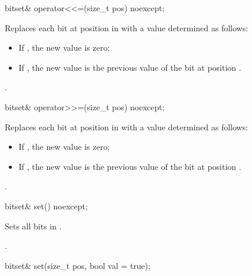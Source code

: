 %
\begin{itemdecl}
bitset& operator<<=(size_t pos) noexcept;
\end{itemdecl}

\begin{itemdescr}
\pnum
\effects
Replaces each bit at position  in
with a value determined as follows:

\begin{itemize}
\item
If , the new value is zero;
\item
If , the new value is the previous
value of the bit at position .
\end{itemize}

\pnum
\returns
{}.
\end{itemdescr}

%
\begin{itemdecl}
bitset& operator>>=(size_t pos) noexcept;
\end{itemdecl}

\begin{itemdescr}
\pnum
\effects
Replaces each bit at position  in
with a value determined as follows:

\begin{itemize}
\item
If , the new value is zero;
\item
If , the new value is the previous value of the bit at position .
\end{itemize}

\pnum
\returns
{}.
\end{itemdescr}

%
%
\begin{itemdecl}
bitset& set() noexcept;
\end{itemdecl}

\begin{itemdescr}
\pnum
\effects
Sets all bits in
.

\pnum
\returns
{}.
\end{itemdescr}

%
%
\begin{itemdecl}
bitset& set(size_t pos, bool val = true);
\end{itemdecl}

